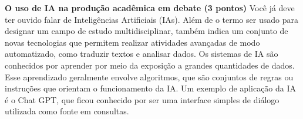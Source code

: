 \documentclass[portuguese]{textolivre}
\begin{document}
\begin{tcolorbox}[
  colback=white,
  colframe=black,
  boxrule=0.6pt,
  arc=0pt,
  left=6pt,
  right=6pt,
  top=6pt,
  bottom=6pt,
  breakable,
  title={Atividade de reflexão sobre uso de IA no ambiente universitário.
Legenda: Trata-se da AV6 aplicada aos estudantes, na semana 3 da Oficina, em formato de fórum de discussão.}
]

\noindent \textbf{ O uso de IA na produção acadêmica em debate (3 pontos)} 
\medskip \newline
Você já deve ter ouvido falar de Inteligências Artificiais (IAs). Além de o termo ser usado para designar um campo de estudo multidisciplinar, também indica um conjunto de novas tecnologias que permitem realizar atividades avançadas de modo automatizado, como traduzir textos e analisar dados. Os sistemas de IA são conhecidos por aprender por meio da exposição a grandes quantidades de dados. Esse aprendizado geralmente envolve algoritmos, que são conjuntos de regras ou instruções que orientam o funcionamento da IA. Um exemplo de aplicação da IA é o Chat GPT, que ficou conhecido por ser uma interface simples de diálogo utilizada como fonte em consultas.


\end{tcolorbox}
\end{document}
